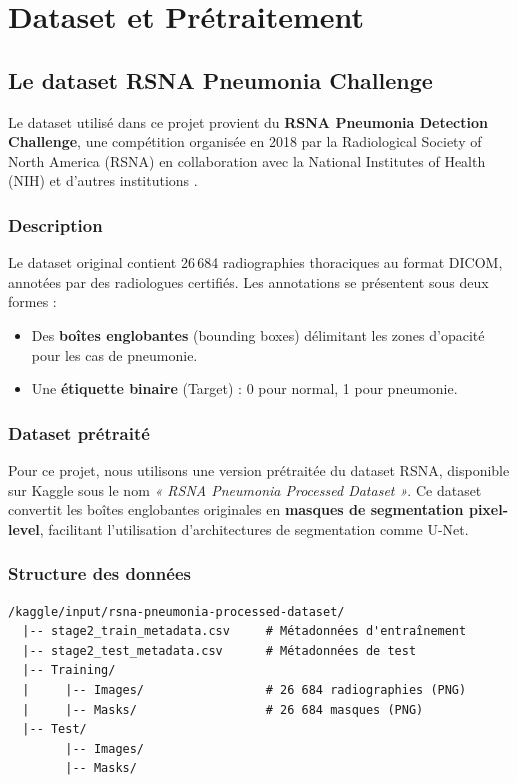 \documentclass[12pt,a4paper,twoside]{report}
\begin{document}
\chapter{Dataset et Prétraitement}

\section{Le dataset RSNA Pneumonia Challenge}

Le dataset utilisé dans ce projet provient du \textbf{RSNA Pneumonia Detection Challenge}, une compétition organisée en 2018 par la Radiological Society of North America (RSNA) en collaboration avec la National Institutes of Health (NIH) et d'autres institutions \cite{rsna2018}.

\subsection{Description}

Le dataset original contient 26\,684 radiographies thoraciques au format DICOM, annotées par des radiologues certifiés. Les annotations se présentent sous deux formes :
\begin{itemize}
  \item Des \textbf{boîtes englobantes} (bounding boxes) délimitant les zones d'opacité pour les cas de pneumonie.
  \item Une \textbf{étiquette binaire} (Target) : 0 pour normal, 1 pour pneumonie.
\end{itemize}

\subsection{Dataset prétraité}

Pour ce projet, nous utilisons une version prétraitée du dataset RSNA, disponible sur Kaggle sous le nom \textit{« RSNA Pneumonia Processed Dataset »}. Ce dataset convertit les boîtes englobantes originales en \textbf{masques de segmentation pixel-level}, facilitant l'utilisation d'architectures de segmentation comme U-Net.

\subsection{Structure des données}

\begin{verbatim}
/kaggle/input/rsna-pneumonia-processed-dataset/
  |-- stage2_train_metadata.csv     # Métadonnées d'entraînement
  |-- stage2_test_metadata.csv      # Métadonnées de test
  |-- Training/
  |     |-- Images/                 # 26 684 radiographies (PNG)
  |     |-- Masks/                  # 26 684 masques (PNG)
  |-- Test/
        |-- Images/
        |-- Masks/
\end{verbatim}
\end{document}
